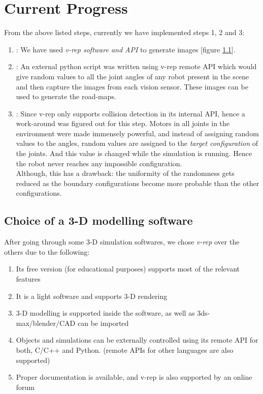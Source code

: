 \documentclass[12pt]{article}
\begin{document}
\section{Current Progress}
From the above listed steps, currently we have implemented steps 1, 2 and 3:
\begin{enumerate}
  \item : We have used \textit{v-rep software and API} to generate images [figure \ref{v-rep}].
  \item : An external python script was written using v-rep remote API which would give random values to all the joint angles of any robot present in the scene and then capture the images from each vision sensor. These images can be used to generate the road-maps.
  \item : Since v-rep only supports collision detection in its internal API, hence a work-around was figured out for this step. Motors in all joints in the environment were made immensely powerful, and instead of assigning random values to the angles, random values are assigned to the \textit{target configuration} of the joints. And this value is changed while the simulation is running. Hence the robot never reaches any impossible configuration.\\ Although, this has a drawback: the uniformity of the randomness gets reduced as the boundary configurations become more probable than the other configurations.
\end{enumerate}

\subsection{Choice of a 3-D modelling software}
\label{v-rep}
After going through some 3-D simulation softwares, we chose \textit{v-rep} over the others due to the following:
\begin{enumerate}
  \item Its free version (for educational purposes) supports most of the relevant features
  \item It is a light software and supports 3-D rendering
  \item 3-D modelling is supported inside the software, as well as 3ds-max/blender/CAD can be imported
  \item Objects and simulations can be externally controlled using its remote API for both, C/C++ and Python. (remote APIs for other languages are also supported)
  \item Proper documentation is available, and v-rep is also supported by an online forum
\end{enumerate}
\end{document}
